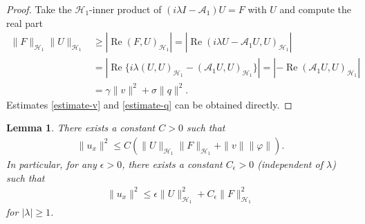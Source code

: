 \documentclass[11pt,reqno]{article}
\newtheorem{lemma}[theorem]{Lemma}
\begin{document}
  \begin{proof}
  	Take the $\mathcal{H}_1$-inner product of $(i\lambda I-\mathcal{A}_1)U=F$ with $U$ and compute the real part
  	\begin{align*}
  		\|F\|_{\mathcal{H}_1}\|U\|_{\mathcal{H}_1}
  		&\geq |\operatorname{Re}(F,U)_{\mathcal{H}_1}| = |\operatorname{Re}(i\lambda U-\mathcal{A}_1U,U)_{\mathcal{H}_1}| \\
  		&= |\operatorname{Re}\{i\lambda(U,U)_{\mathcal{H}_1} - (\mathcal{A}_1U,U)_{\mathcal{H}_1}\}| = |-\operatorname{Re}(\mathcal{A}_1U,U)_{\mathcal{H}_1}|\\
  		&= \gamma \|v\|^2 + \sigma \|q\|^2.
  	\end{align*}
  	Estimates \eqref{estimate-v} and \eqref{estimate-q} can be obtained directly.
  \end{proof}
  \begin{lemma}\label{lemma-ux}
  	There exists a constant $C>0$ such that
  	\begin{align}\label{estimate-ux-1}
  		\|u_x\|^2 \leq C(\|U\|_{\mathcal{H}_1}\|F\|_{\mathcal{H}_1} + \|v\|\|\varphi\|).
  	\end{align}
  	In particular, for any $\epsilon>0$, there exists a constant $C_{\epsilon}>0$ (independent of $\lambda$) such that
  	\begin{align}\label{estimate-ux-2}
  		\|u_x\|^2 \leq \epsilon\|U\|_{\mathcal{H}_1}^2 + C_{\epsilon}\|F\|_{\mathcal{H}_1}^2
  	\end{align}
  	for $|\lambda| \geq 1$.
  \end{lemma}
\end{document}
